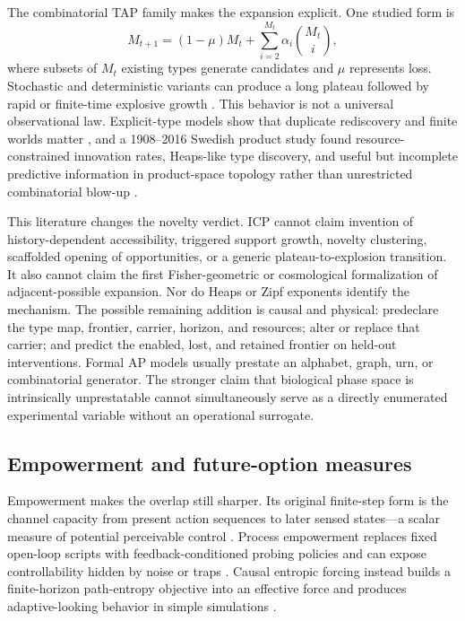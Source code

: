 The combinatorial TAP family makes the expansion explicit. One studied form is
\begin{equation}
 M_{t+1}=(1-\mu)M_t+
 \sum_{i=2}^{M_t}\alpha_i\binom{M_t}{i},
 \label{eq:tap-equation}
\end{equation}
where subsets of $M_t$ existing types generate candidates and $\mu$ represents
loss. Stochastic and deterministic variants can produce a long plateau followed
by rapid or finite-time explosive growth
\citep{SteelEtAl2020Combinatorial,CortesEtAl2025TAP}. This behavior is not a
universal observational law. Explicit-type models show that duplicate
rediscovery and finite worlds matter \citep{VillaniSerra2023BinaryString}, and a
1908--2016 Swedish product study found resource-constrained innovation rates,
Heaps-like type discovery, and useful but incomplete predictive information in
product-space topology rather than unrestricted combinatorial blow-up
\citep{Taalbi2026AdjacentPossible}.

This literature changes the novelty verdict. ICP cannot claim invention of
history-dependent accessibility, triggered support growth, novelty clustering,
scaffolded opening of opportunities, or a generic plateau-to-explosion
transition. It also cannot claim the first Fisher-geometric or cosmological
formalization of adjacent-possible expansion. Nor do Heaps or Zipf exponents
identify the mechanism. The possible
remaining addition is causal and physical: predeclare the type map, frontier,
carrier, horizon, and resources; alter or replace that carrier; and predict the
enabled, lost, and retained frontier on held-out interventions. Formal AP models
usually prestate an alphabet, graph, urn, or combinatorial generator. The
stronger claim that biological phase space is intrinsically unprestatable
\citep{LongoEtAl2012Enablement,Kauffman2014Prolegomenon,
PatraKauffman2025NoLaw} cannot simultaneously serve as a directly enumerated
experimental variable without an operational surrogate.

\subsection{Empowerment and future-option measures}

Empowerment makes the overlap still sharper. Its original finite-step form is
the channel capacity from present action sequences to later sensed states---a
scalar measure of potential perceivable control \citep{KlyubinEtAl2005Empowerment}.
Process empowerment replaces fixed open-loop scripts with feedback-conditioned
probing policies and can expose controllability hidden by noise or traps
\citep{TiomkinEtAl2025ProcessEmpowerment}. Causal entropic forcing instead
builds a finite-horizon path-entropy objective into an effective force and
produces adaptive-looking behavior in simple simulations
\citep{WissnerGrossFreer2013CausalEntropy}.

